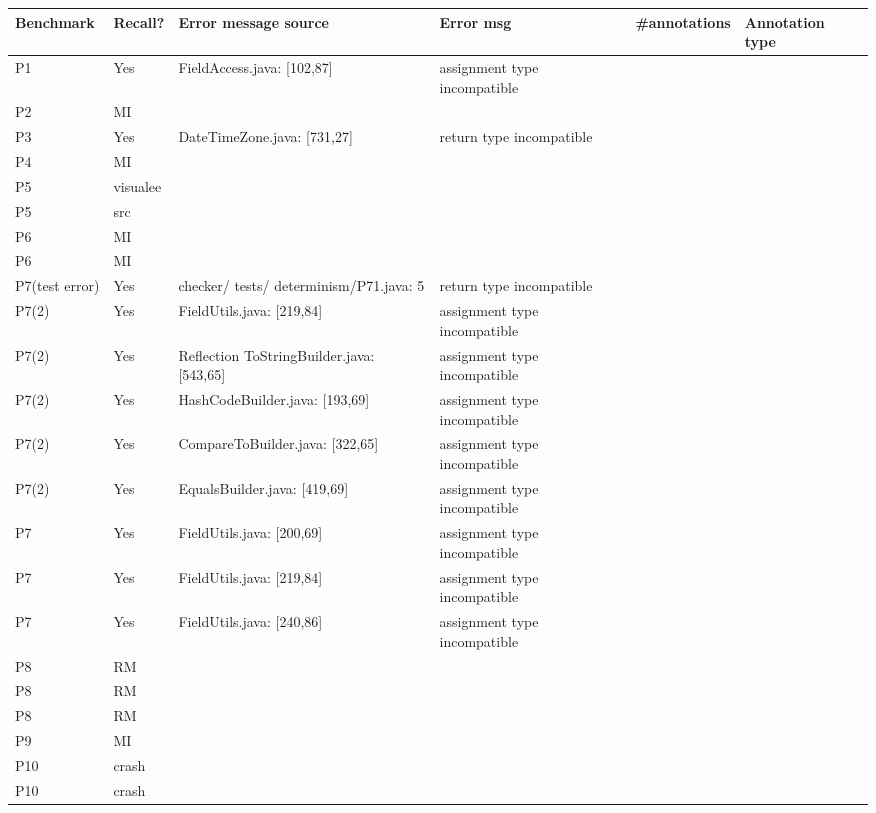\begin{table}[]
    \begin{tabular}{|p{1.5cm}|p{1cm}|p{3cm}|p{4cm}|p{2cm}|p{1.5cm}|}
        \hline
        Benchmark & Recall? & Error message source & Error msg & \#annotations & Annotation type  \\ \hline
        P1 & Yes & FieldAccess.java: [102,87] & assignment type incompatible &  &   \\
        P2 & MI &  &  &  &  \\
        P3 & Yes & DateTimeZone.java: [731,27] &  return type incompatible&  &  \\ 
        P4 & MI &  &  &  &  \\ 
        P5 & visualee &  &  &  &  \\ 
        P5 & src &  &  &  &  \\ 
        P6 & MI &  &  &  &  \\ 
        P6 & MI &  &  &  &  \\
        P7(test error) & Yes & checker/ tests/ determinism/P71.java: 5 & return type incompatible &  &  \\ 
        P7(2) & Yes & FieldUtils.java: [219,84] & assignment type incompatible &  &  \\
        P7(2) & Yes & Reflection ToStringBuilder.java: [543,65]  & assignment type incompatible &  &  \\
        P7(2) & Yes & HashCodeBuilder.java: [193,69]  & assignment type incompatible &  &  \\
        P7(2) & Yes & CompareToBuilder.java: [322,65] & assignment type incompatible &  &  \\
        P7(2) & Yes & EqualsBuilder.java: [419,69]  & assignment type incompatible &  &  \\
        P7 & Yes & FieldUtils.java: [200,69] & assignment type incompatible & &  \\
        P7 & Yes & FieldUtils.java: [219,84] & assignment type incompatible &  &  \\
        P7 & Yes & FieldUtils.java: [240,86] & assignment type incompatible &  &  \\
        P8 & RM &  &  &  &  \\
        P8 & RM &  &  &  &  \\
        P8 & RM &  &  &  &  \\
        P9 & MI &  &  &  &  \\
        P10 & crash &  &  &  &  \\
        P10 & crash &  &  &  &  \\

\end{tabular}
\end{table}
